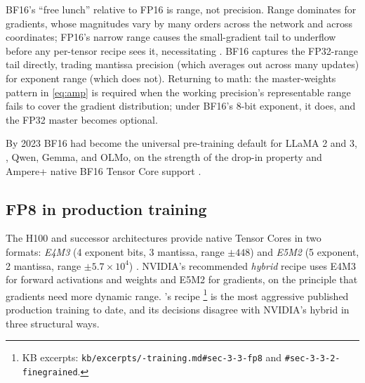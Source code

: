 \begin{intuition}
BF16's ``free lunch'' relative to FP16 is range, not precision. Range
dominates for gradients, whose magnitudes vary by many orders across
the network and across coordinates; FP16's narrow range causes the
small-gradient tail to underflow before any per-tensor recipe sees it,
necessitating . BF16 captures the FP32-range tail directly,
trading mantissa precision (which averages out across many updates) for
exponent range (which does not). Returning to math: the master-weights
pattern in \cref{eq:amp} is required when the working precision's
representable range fails to cover the gradient distribution; under
BF16's 8-bit exponent, it does, and the FP32 master becomes optional.
\end{intuition}

By 2023 BF16 had become the universal pre-training default for LLaMA
2 and 3, , Qwen, Gemma, and OLMo, on the strength of the
drop-in property and Ampere+ native BF16 Tensor Core support
\citep[\S 2.2.4]{torchtitan2024}.

\subsection{FP8 in production training}
\label{sec:mp-fp8}

The H100 and successor architectures provide native  Tensor Cores
in two formats: \emph{E4M3} (4 exponent bits, 3 mantissa, range
$\pm 448$) and \emph{E5M2} (5 exponent, 2 mantissa, range $\pm
5.7\times 10^{4}$) \citep[\S 3.3]{deepseek-v3}. NVIDIA's recommended
\emph{hybrid} recipe uses E4M3 for forward activations and weights
and E5M2 for gradients, on the principle that gradients need more
dynamic range. 's recipe \citep[\S 3.3.1, \S
3.3.2]{deepseek-v3}\footnote{KB excerpts:
\texttt{kb/excerpts/-training.md\#sec-3-3-fp8} and
\texttt{\#sec-3-3-2-finegrained}.} is the most aggressive published
production  training to date, and its decisions disagree with
NVIDIA's hybrid in three structural ways.

